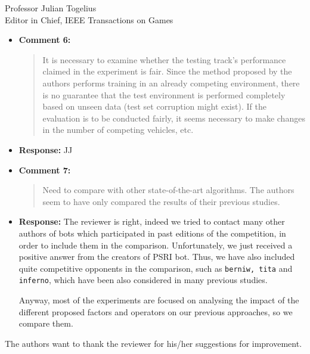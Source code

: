 \documentclass[10pt]{letter} %
\begin{document}
\begin{letter}{Professor Julian Togelius \\ Editor in Chief, IEEE Transactions on Games}
\begin{enumerate}
\begin{itemize}
		\item {\bf Comment 6:}
		\begin{quote}
It is necessary to examine whether the testing track's performance claimed in the experiment is fair. Since the method proposed by the authors performs training in an already competing environment, there is no guarantee that the test environment is performed completely based on unseen data (test set corruption might exist). If the evaluation is to be conducted fairly, it seems necessary to make changes in the number of competing vehicles, etc.
			\end{quote}	
		\item {\bf Response:} 
		JJ
		\item {\bf Comment 7:}
		\begin{quote}
Need to compare with other state-of-the-art algorithms. The authors seem to have only compared the results of their previous studies.				
			\end{quote}	
		\item {\bf Response:} 
		The reviewer is right, indeed we tried to contact many other authors of bots which participated in past editions of the competition, in order to include them in the comparison. Unfortunately, we just received a positive answer from the creators of PSRI bot. Thus, we have also included quite competitive opponents in the comparison, such as \texttt{berniw, tita} and \texttt{inferno}, which have been also considered in many previous studies.

Anyway, most of the experiments are focused on analysing the impact of the different proposed factors and operators on our previous approaches, so we compare them. 
		
	\end{itemize}					

The authors want to thank the reviewer for his/her suggestions for improvement.


\end{enumerate}
 


\end{letter}
\end{document}
